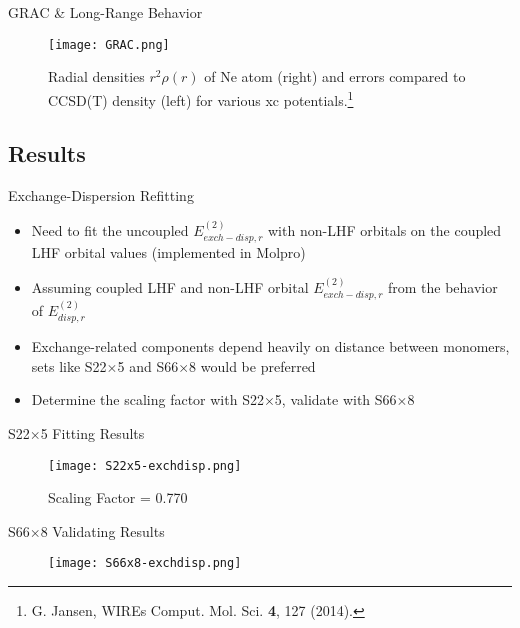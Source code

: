 \documentclass{beamer}
\begin{document}
        \begin{frame}{GRAC \& Long-Range Behavior}
            \begin{figure}
            \centering
            \texttt{[image: GRAC.png]}
            \caption{Radial densities $r^2\rho(r)$ of Ne atom (right) and errors compared to CCSD(T) density (left) for various xc potentials.\footnote{G. Jansen, WIREs Comput. Mol. Sci. \textbf{4}, 127 (2014).}} 
            \end{figure}
        \end{frame}

    \subsection{Results}
    
        \begin{frame}{Exchange-Dispersion Refitting}
            \begin{itemize}
                \item Need to fit the uncoupled $E_{exch-disp,r}^{(2)}$ with non-LHF orbitals on the coupled LHF orbital values (implemented in Molpro)
                \item Assuming coupled LHF and non-LHF orbital $E_{exch-disp,r}^{(2)}$ from the behavior of $E_{disp,r}^{(2)}$
                \item Exchange-related components depend heavily on distance between monomers, sets like S22$\times$5 and S66$\times$8 would be preferred
                \item Determine the scaling factor with S22$\times$5, validate with S66$\times$8 
            \end{itemize}
        \end{frame}

        \begin{frame}{S22$\times$5 Fitting Results}
            \begin{figure}
                \centering
                \texttt{[image: S22x5-exchdisp.png]}
                \caption{Scaling Factor = 0.770}
            \end{figure}   
        \end{frame}

        \begin{frame}{S66$\times$8 Validating Results}
            \begin{figure}
                \centering
                \texttt{[image: S66x8-exchdisp.png]}
            \end{figure}  
        \end{frame}
\end{document}
